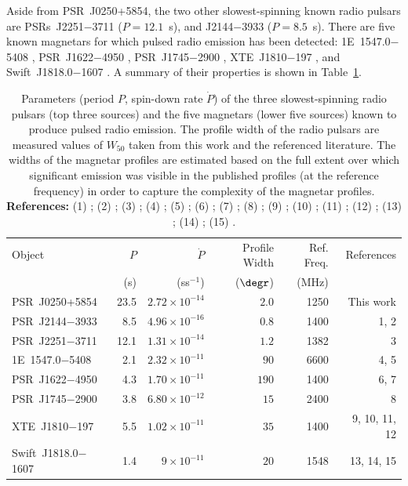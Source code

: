 Aside from PSR~J0250+5854, the two other slowest-spinning known radio pulsars are PSRs~J2251$-$3711 ($P=12.1$~s), and J2144$-$3933 ($P=8.5$~s). There are five known magnetars for which pulsed radio emission has been detected: 1E~1547.0$-$5408 \citep{CRHR2007a}, PSR~J1622$-$4950 \citep{LBB+2010}, PSR~J1745$-$2900 \citep{EFK+2013}, XTE~J1810$-$197 \citep{CRH+2006}, and Swift~J1818.0$-$1607 \citep{ERB+2020, LSJB2020}. A summary of their properties is shown in Table~\ref{tab: J0250 - magnetar comparison}.
\begin{table}
	\centering
	\caption[Properties of the slow rotation-powered pulsars and radio magnetars]{Parameters (period $P$, spin-down rate $\dot{P}$) of the three slowest-spinning radio pulsars (top three sources) and the five magnetars (lower five sources) known to produce pulsed radio emission. The profile width of the radio pulsars are measured values of $W_{50}$ taken from this work and the referenced literature. The widths of the magnetar profiles are estimated based on the full extent over which significant emission was visible in the published profiles (at the reference frequency) in order to capture the complexity of the magnetar profiles. \newline \textbf{References:} (1) \citet{YMJx1999}; (2) \citet{MBMA2020}; (3) \citet{MKE+2020}; (4) \citet{CRHR2007a}; (5) \citet{CRJ+2008}; (6) \citet{LBB+2010}; (7) \citet{LBB+2012}; (8) \citet{EFK+2013}; (9) \citet{CRH+2006}; (10) \citet{CRJ+2007b}; (11) \citet{KSJ+2007}; (12) \citet{LLD+2019}; (13) \citet{ERB+2020}; (14) \citet{LSJB2020}; (15) \citet{CCC+2020}.}
	\label{tab: J0250 - magnetar comparison}
	\begin{tabular}{lrrrrr} %
		\hline
	    Object & $P$  & $\dot{P}$   & Profile Width & Ref. Freq.  & References\\
	           &  (s) & (ss$^{-1}$) & ($\degr$)     &       (MHz) &           \\        
		\hline
		PSR~J0250+5854          & 23.5 & $2.72\times10^{-14}$ &  $2.0$ & 1250 & This work\\
		PSR~J2144$-$3933        & 8.5  & $4.96\times10^{-16}$ &  $0.8$ & 1400 & 1, 2\\
		PSR~J2251$-$3711        & 12.1 & $1.31\times10^{-14}$ & $1.2$  & 1382 & 3\\
		\hline
		1E~1547.0$-$5408        & 2.1  & $2.32\times10^{-11}$ & $90$   & 6600 & 4, 5\\
        PSR~J1622$-$4950        & 4.3  & $1.70\times10^{-11}$ & $190$  & 1400 & 6, 7\\
        PSR~J1745$-$2900        & 3.8  & $6.80\times10^{-12}$ & $15$   & 2400 & 8\\
        XTE~J1810$-$197          & 5.5  & $1.02\times10^{-11}$ & $35$   & 1400 & 9, 10, 11, 12\\
        Swift~J1818.0$-$1607    & 1.4  & $9\times10^{-11}$    & $20$   & 1548 & 13, 14, 15\\
		\hline
	\end{tabular}
\end{table}

